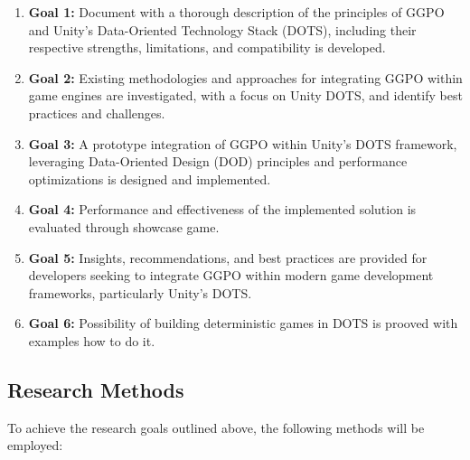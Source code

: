 \begin{enumerate}
    \item \textbf{Goal 1:} Document with a thorough description of the principles of GGPO and Unity's Data-Oriented Technology Stack (DOTS), including their respective strengths, limitations, and compatibility is developed.
    
    \item \textbf{Goal 2:} Existing methodologies and approaches for integrating GGPO within game engines are investigated, with a focus on Unity DOTS, and identify best practices and challenges.
    
    \item \textbf{Goal 3:} A prototype integration of GGPO within Unity's DOTS framework, leveraging Data-Oriented Design (DOD) principles and performance optimizations is designed and implemented.
    
    \item \textbf{Goal 4:} Performance and effectiveness of the implemented solution is evaluated through showcase game.
    
    \item \textbf{Goal 5:} Insights, recommendations, and best practices are provided for developers seeking to integrate GGPO within modern game development frameworks, particularly Unity's DOTS.
    
    \item \textbf{Goal 6:} Possibility of building deterministic games in DOTS is prooved with examples how to do it.
\end{enumerate}

\subsection{Research Methods}

To achieve the research goals outlined above, the following methods will be employed:

